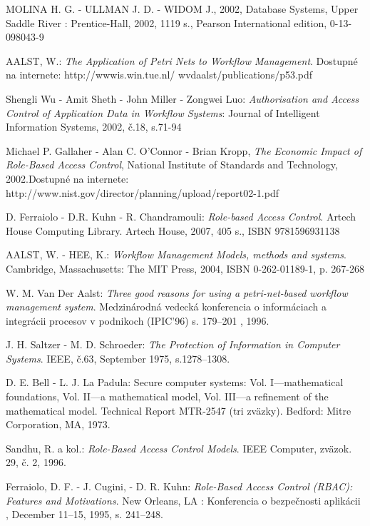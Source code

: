 \documentclass[12pt, oneside]{book}
\begin{document}
\begin{thebibliography}{5}
 
 MOLINA H. G. - ULLMAN J. D. - WIDOM J., 2002, Database Systems, Upper Saddle River : Prentice-Hall, 2002, 1119 s., Pearson International edition, 0-13-098043-9

AALST, W.: \textit{The Application of Petri Nets to Workflow Management}. Dostupné
na internete: http://wwwis.win.tue.nl/ wvdaalst/publications/p53.pdf

Shengli Wu - Amit Sheth - John Miller - Zongwei Luo:\textit{ Authorisation and Access Control of Application Data
	in Workflow Systems}: Journal of Intelligent Information Systems, 2002, č.18, s.71-94

Michael P. Gallaher - Alan C. O'Connor - Brian Kropp, \textit{ The Economic Impact
of Role-Based Access Control}, National Institute of Standards and Technology,
2002.Dostupné na internete: http://www.nist.gov/director/planning/upload/report02-1.pdf

D. Ferraiolo - D.R. Kuhn - R. Chandramouli: \textit{Role-based Access Control}. Artech
House Computing Library. Artech House, 2007, 405 s., ISBN 9781596931138


AALST, W. - HEE, K.: \textit{Workflow Management Models, methods and systems}. Cambridge,
Massachusetts: The MIT Press, 2004, ISBN 0-262-01189-1, p.
267-268

W. M. Van Der Aalst: \textit{Three good reasons for using a petri-net-based workflow
management system}. Medzinárodná vedecká konferencia o informáciach a integrácii procesov v podnikoch (IPIC’96)
s. 179–201 , 1996.

J. H. Saltzer - M. D. Schroeder: \textit{The Protection of Information in Computer
Systems}.  IEEE, č.63, September 1975, s.1278–1308.

D. E. Bell - L. J. La Padula: Secure computer systems: Vol. I—mathematical
foundations,  Vol. II—a mathematical model,  Vol. III—a refinement of the mathematical
model. Technical Report MTR-2547 (tri zväzky). Bedford: Mitre Corporation, MA, 1973.

Sandhu, R. a kol.: \textit{Role-Based Access Control Models}. IEEE Computer, zväzok.
29, č. 2, 1996.

Ferraiolo, D. F. -  J. Cugini, - D. R. Kuhn:\textit{ Role-Based Access Control
(RBAC): Features and Motivations}.  New Orleans, LA : Konferencia o bezpečnosti aplikácii
, December 11–15, 1995,
s. 241–248.


\end{thebibliography}
\end{document}
